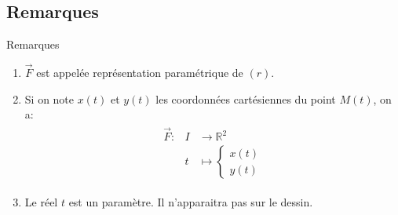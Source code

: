 \documentclass[14pt]{beamer}
\begin{document}
\subsection{Remarques}
\begin{frame}{}
        \begin{block}{Remarques}
                \begin{enumerate}
                        \item $\vec{F}$ est appelée représentation paramétrique de $(r)$.
                        \item Si on note $x(t)$ et $y(t)$ les coordonnées cartésiennes du point $M(t)$, on a:
                \begin{align*}
                \begin{array}{lll}
                        \vec{F}: & I &\to \mathbb{R}^2\\
                        & t &\mapsto \left\{\begin{array}{r}x(t)\\y(t)\end{array}\right.
                \end{array}
                \end{align*}
        \item Le réel $t$ est un paramètre. Il n'apparaitra pas sur le dessin.
                \end{enumerate}
        \end{block}
\end{frame}
\end{document}
